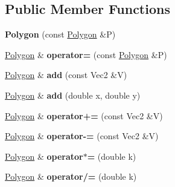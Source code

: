 \subsection*{Public Member Functions}
\begin{DoxyCompactItemize}
\item 
\hypertarget{classg2c_1_1_polygon_aa44b8ce94bdad2fdf0984c4e8e0b66d3}{
{\bfseries Polygon} (const \hyperlink{classg2c_1_1_polygon}{Polygon} \&P)}
\label{classg2c_1_1_polygon_aa44b8ce94bdad2fdf0984c4e8e0b66d3}

\item 
\hypertarget{classg2c_1_1_polygon_a5f1cb502b4b90fa770ff08efa04c59ff}{
\hyperlink{classg2c_1_1_polygon}{Polygon} \& {\bfseries operator=} (const \hyperlink{classg2c_1_1_polygon}{Polygon} \&P)}
\label{classg2c_1_1_polygon_a5f1cb502b4b90fa770ff08efa04c59ff}

\item 
\hypertarget{classg2c_1_1_polygon_ad565ed0ec7a721969bc1df7326f0a7da}{
\hyperlink{classg2c_1_1_polygon}{Polygon} \& {\bfseries add} (const Vec2 \&V)}
\label{classg2c_1_1_polygon_ad565ed0ec7a721969bc1df7326f0a7da}

\item 
\hypertarget{classg2c_1_1_polygon_a208febc8148a57dd0912c4f6b97d95db}{
\hyperlink{classg2c_1_1_polygon}{Polygon} \& {\bfseries add} (double x, double y)}
\label{classg2c_1_1_polygon_a208febc8148a57dd0912c4f6b97d95db}

\item 
\hypertarget{classg2c_1_1_polygon_a1fb95a077fc91fbe5ae86a377c9edf55}{
\hyperlink{classg2c_1_1_polygon}{Polygon} \& {\bfseries operator+=} (const Vec2 \&V)}
\label{classg2c_1_1_polygon_a1fb95a077fc91fbe5ae86a377c9edf55}

\item 
\hypertarget{classg2c_1_1_polygon_a03d8e3d600d205261f329c2bdab3fc63}{
\hyperlink{classg2c_1_1_polygon}{Polygon} \& {\bfseries operator-\/=} (const Vec2 \&V)}
\label{classg2c_1_1_polygon_a03d8e3d600d205261f329c2bdab3fc63}

\item 
\hypertarget{classg2c_1_1_polygon_afae4fbaf257bac8219b8daee2b3fd8c4}{
\hyperlink{classg2c_1_1_polygon}{Polygon} \& {\bfseries operator$\ast$=} (double k)}
\label{classg2c_1_1_polygon_afae4fbaf257bac8219b8daee2b3fd8c4}

\item 
\hypertarget{classg2c_1_1_polygon_af57063988da8fd591774a5b33702ca8f}{
\hyperlink{classg2c_1_1_polygon}{Polygon} \& {\bfseries operator/=} (double k)}
\label{classg2c_1_1_polygon_af57063988da8fd591774a5b33702ca8f}


\end{DoxyCompactItemize}
